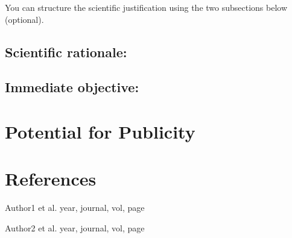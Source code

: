 \documentclass[12pt,a4paper]{article}
\begin{document}
You can structure the scientific justification using the two subsections below (optional).

\subsection{Scientific rationale:}


\subsection{Immediate objective:}



\section{Potential for Publicity}




\section{References}


\noindent [1] Author1 et al. year, journal, vol, page

\noindent [2] Author2 et al. year, journal, vol, page


\end{document}
